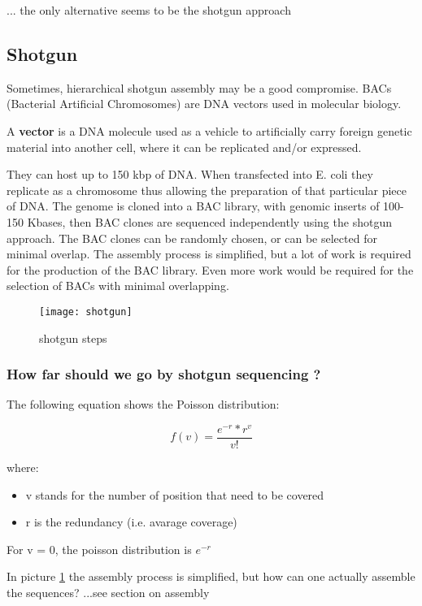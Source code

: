 ... the only alternative seems to be the shotgun approach

\subsection{Shotgun}

Sometimes, hierarchical shotgun assembly may be a good compromise. 
BACs (Bacterial Artificial Chromosomes) are DNA vectors used in molecular
biology.

A \textbf{vector} is a DNA molecule used as a vehicle to artificially
carry foreign genetic material into another cell, where it can be replicated
and/or expressed. 

They can host up to 150 kbp of DNA. 
When transfected into E. coli they replicate as a chromosome thus allowing
the preparation of that particular piece of DNA.
The genome is cloned into a BAC library, with genomic inserts of 100-150 Kbases,
then BAC clones are sequenced independently using the shotgun approach.
The BAC clones can be randomly chosen, or can be selected for minimal overlap.
The assembly process is simplified, but a lot of work is required for the production of the BAC library.
Even more work would be required for the selection of BACs with minimal overlapping.

\begin{figure}[H]
  \centering
  \texttt{[image: shotgun]}
  \caption{shotgun steps}
  \label{fig:shotgun}
\end{figure}

\subsubsection{How far should we go by shotgun sequencing ? }

The following equation shows the Poisson distribution:

\begin{equation}
f(v) = \frac{e^{-r}*r^v}{v!}
\end{equation}

where:

\begin{itemize}
  \item v stands for the number of position that need to be covered
  \item r is the redundancy (i.e. avarage coverage)
\end{itemize}

For v = 0, the poisson distribution is $e^{-r}$

In picture \ref{fig:shotgun} the assembly process is simplified,
but how can one actually assemble the sequences?
...see section on assembly
